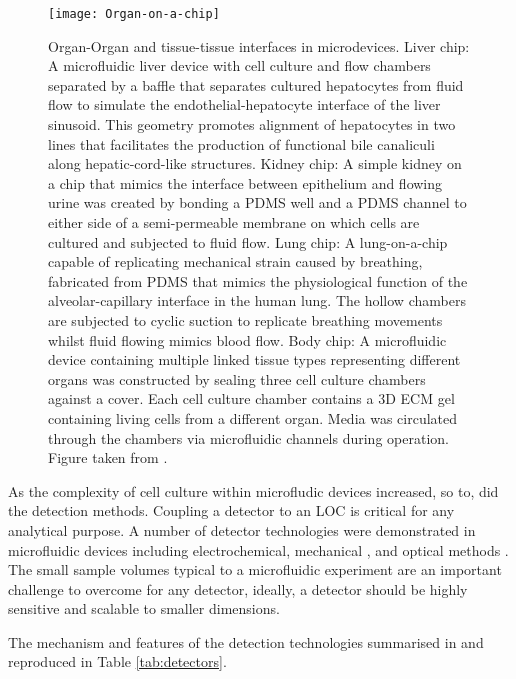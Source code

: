 \begin{figure}
  \begin{center}
  \texttt{[image: Organ-on-a-chip]}
  \end{center}
  \caption{Organ-Organ and tissue-tissue interfaces in microdevices. Liver chip: A microfluidic liver device with cell culture and flow chambers separated by
  a baffle that separates cultured hepatocytes from fluid flow to simulate the endothelial-hepatocyte interface of the liver sinusoid. This geometry promotes alignment
  of hepatocytes in two lines that facilitates the production of functional bile canaliculi along hepatic-cord-like structures\citep{nakao2011bile}. Kidney chip:
  A simple kidney on a chip that mimics the interface between epithelium and flowing urine was created by bonding a PDMS well and a PDMS channel to either side
  of a semi-permeable membrane on which cells are cultured and subjected to fluid flow\citep{jang2010multi}. Lung chip: A lung-on-a-chip capable of replicating mechanical
  strain caused by breathing, fabricated from PDMS that mimics the physiological function of the alveolar-capillary interface in the human lung. The hollow chambers
  are subjected to cyclic suction to replicate breathing movements whilst fluid flowing mimics blood flow\citep{huh2010reconstituting}. Body chip: A
  microfluidic device containing multiple linked tissue types representing different organs was constructed by sealing three cell culture chambers against a cover. Each
  cell culture chamber contains a 3D ECM gel containing living cells from a different organ. Media was circulated through the chambers via microfluidic channels
  during operation\citep{sung2009micro}. Figure taken from \citep{huh2012microengineered}.}
  \label{fig:OrganChip}
\end{figure}

As the complexity of cell culture within microfludic devices increased, so to, did the detection methods. Coupling
a detector to an LOC is critical for any analytical purpose. A number of detector technologies were demonstrated in
microfluidic devices including electrochemical\citep{wang2006electrochemical}, mechanical \citep{raiteri2001micromechanical},
and optical methods \citep{kuswandi2007optical}. The small sample volumes typical to a microfluidic experiment
are an important challenge to overcome for any detector, ideally, a detector should be highly sensitive and scalable
to smaller dimensions.

The mechanism and features of the detection technologies summarised in \citep{pires2014recent} and
reproduced in Table \ref{tab:detectors}.

